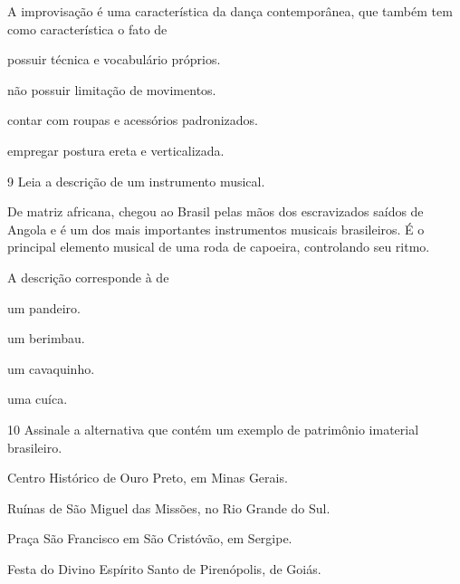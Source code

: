 \pagebreak
A improvisação é uma característica da dança contemporânea, que também tem como característica o fato de

\begin{escolha}
\item
  possuir técnica e vocabulário próprios.
\item
  não possuir limitação de movimentos.
\item
  contar com roupas e acessórios padronizados.
\item
  empregar postura ereta e verticalizada.
\end{escolha}


\num{9}  Leia a descrição de um instrumento musical.

\begin{myquote}
De matriz africana, chegou ao Brasil pelas mãos dos escravizados saídos de Angola
e é um dos mais importantes instrumentos musicais brasileiros. É o principal
elemento musical de uma roda de capoeira, controlando seu ritmo.
\end{myquote}

A descrição corresponde à de

\begin{escolha}
\item
  um pandeiro.
\item
  um berimbau.
\item
  um cavaquinho.
\item
  uma cuíca.
\end{escolha}

\num{10} Assinale a alternativa que contém um exemplo de patrimônio imaterial brasileiro.

\begin{escolha}
\item
  Centro Histórico de Ouro Preto, em Minas Gerais.
\item
  Ruínas de São Miguel das Missões, no Rio Grande do Sul.
\item
  Praça São Francisco em São Cristóvão, em Sergipe.
\item
  Festa do Divino Espírito Santo de Pirenópolis, de Goiás.
\end{escolha}



%
%

